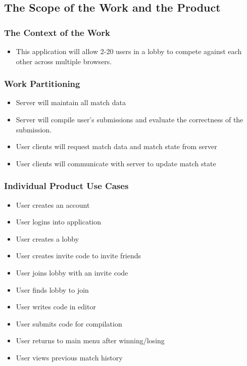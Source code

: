 \documentclass[12pt, titlepage]{article}
\begin{document}
\subsection{The Scope of the Work and the Product}

\subsubsection{The Context of the Work}
\begin{itemize} 
    \item This application will allow 2-20 users in a lobby to compete against each other across multiple browsers.
\end{itemize}

\subsubsection{Work Partitioning}
\begin{itemize} 
    \item Server will maintain all match data
    \item Server will compile user's submissions and evaluate the correctness of the submission. 
    \item User clients will request match data and match state from server
    \item User clients will communicate with server to update match state
\end{itemize}

\subsubsection{Individual Product Use Cases}
\begin{itemize} 
    \item{User creates an account}
    \item{User logins into application}
    \item{User creates a lobby}
    \item{User creates invite code to invite friends}
    \item{User joins lobby with an invite code}
    \item{User finds lobby to join}
    \item{User writes code in editor}
    \item{User submits code for compilation}
    \item{User returns to main menu after winning/losing}
    \item{User views previous match history}
\end{itemize}
\end{document}
